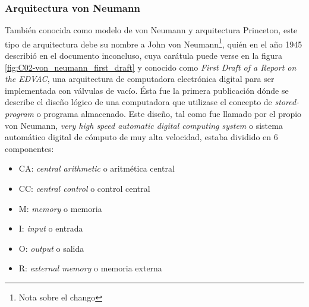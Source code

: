 \subsubsection{Arquitectura von Neumann}

También conocida como modelo de von Neumann y arquitectura Princeton, este tipo de arquitectura debe su nombre a John von Neumann\footnote{Nota sobre el chango}, quién en el año 1945 describió en el documento inconcluso, cuya carátula puede verse en la figura \ref{fig:C02-von_neumann_first_draft} y conocido como \emph{First Draft of a Report on the EDVAC}\cite{vonNeumann}, una arquitectura de computadora electrónica digital para ser implementada con válvulas de vacío. Ésta fue la primera publicación dónde se describe el diseño lógico de una computadora que utilizase el concepto de \emph{stored-program} o programa almacenado. Este diseño, tal como fue llamado por el propio von Neumann, \emph{very high speed automatic digital computing system} o sistema automático digital de cómputo de muy alta velocidad, estaba dividido en 6 componentes:
\begin{itemize}
  \item CA: \emph{central arithmetic} o aritmética central
  \item CC: \emph{central control} o control central
  \item M: \emph{memory} o memoria
  \item I: \emph{input} o entrada
  \item O: \emph{output} o salida
  \item R: \emph{external memory} o memoria externa
\end{itemize}
